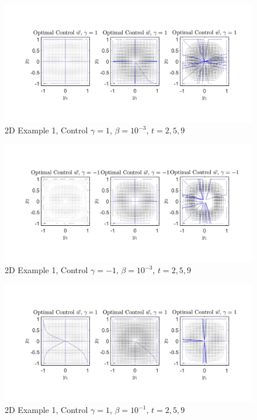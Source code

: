 \documentclass[11pt, a4paper]{article}
\theoremstyle{definition}
\begin{document}
	\begin{figure}[h]
		\includegraphics[scale=0.25]{FigC1.jpg}
		\caption{2D Example 1, Control $\gamma = 1$, $\beta = 10^{-3}$, $t = 2,5,9$}
		\label{Control1}
    \end{figure}
	\begin{figure}[h]
		\includegraphics[scale=0.25]{FigC2.jpg}
		\caption{2D Example 1, Control $\gamma = - 1$, $\beta = 10^{-3}$, $t = 2,5,9$}
		\label{Control2}
	\end{figure}
	\begin{figure}[h]
		\includegraphics[scale=0.25]{FigC3.jpg}
		\caption{2D Example 1, Control $\gamma = 1$, $\beta = 10^{-1}$, $t = 2,5,9$}
		\label{Control3}
	\end{figure}
\end{document}
